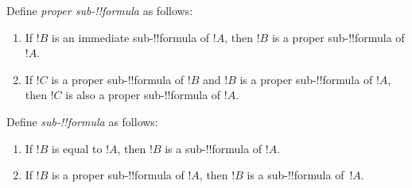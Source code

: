 \documentclass[../../include/open-logic-section]{subfiles}
\begin{document}

\begin{defn}
Define \emph{proper sub-!!{formula}} as follows:
\begin{enumerate}
\item If $!B$ is an immediate sub-!!{formula} of $!A$, then $!B$ is a
  proper sub-!!{formula} of $!A$.
\item If $!C$ is a proper sub-!!{formula} of $!B$ and $!B$ is a proper
  sub-!!{formula} of $!A$, then $!C$ is also a proper sub-!!{formula} of $!A$.
\end{enumerate}
\end{defn}

\begin{defn}
Define \emph{sub-!!{formula}} as follows:
\begin{enumerate}
\item If $!B$ is equal to $!A$, then $!B$ is a sub-!!{formula} of $!A$.
\item If $!B$ is a proper sub-!!{formula} of $!A$, then $!B$ is a
  sub-!!{formula} of~$!A$.
\end{enumerate}
\end{defn}

\end{document}
